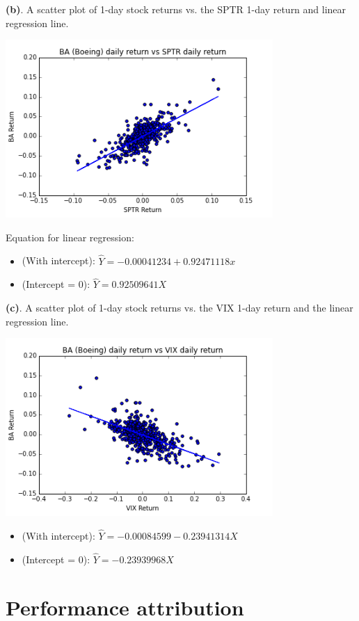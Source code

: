 \documentclass[11pt,letter]{article}
\begin{document}
\textbf{(b)}. A scatter plot of 1-day stock returns vs. the SPTR 1-day return and linear regression line.
\begin{center}
\includegraphics[width=4in,keepaspectratio]{1bBARetSPTRscatter}
\end{center}
Equation for linear regression:
\begin{itemize}
\item (With intercept): $ \hat{Y} = -0.00041234 + 0.92471118 x$
\item (Intercept = 0): $ \hat{Y} = 0.92509641 X$
\end{itemize}


\textbf{(c)}. A scatter plot of 1-day stock returns vs. the VIX 1-day return and the linear regression line.
\begin{center}
\includegraphics[width=4in,keepaspectratio]{1cBARetVIXscatter}
\end{center}
\begin{itemize}
\item (With intercept): $ \hat{Y} = -0.00084599 -0.23941314 X$
\item (Intercept = 0): $ \hat{Y} = -0.23939968 X$
\end{itemize}


\section{Performance attribution}
\end{document}
